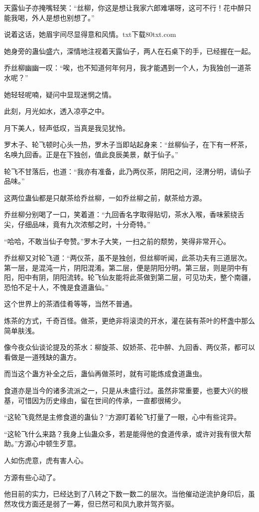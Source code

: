 \begin{this_body}
天露仙子亦掩嘴轻笑：“丝柳，你这是想让我家六郎难堪呀，这可不行！花中醉只能我喝，外人是想也别想了。”

说着这话，她眉宇间尽显得意和风情。txt下载80txt.com

她身旁的蛊仙盛六，深情地注视着天露仙子，两人在石桌下的手，已经握在一起。

乔丝柳幽幽一叹：“唉，也不知道何年何月，我才能遇到一个人，为我独创一道茶水呢？”

她轻轻呢喃，疑问中显现迷惘之情。

此刻，月光如水，透入凉亭之中。

月下美人，轻声低叹，当真是我见犹怜。

罗木子、轮飞顿时心头一热，罗木子当即站起身来：“丝柳仙子，在下有一杯茶，名唤九回香。正是在下独创，值此良辰美景，献于仙子。”

轮飞不甘落后，也道：“我亦有准备，此乃两仪茶，阴阳之间，泾渭分明，请仙子品味。”

这两位蛊仙都是只献茶给乔丝柳，一如乔丝柳之前，献茶给方源。

乔丝柳分别喝了一口，笑着道：“九回香名字取得贴切，茶水入喉，香味萦绕舌尖，仔细品味，竟有九次浓郁之时，十分奇特。”

“哈哈，不敢当仙子夸赞。”罗木子大笑，一扫之前的颓势，笑得非常开心。

乔丝柳又对轮飞道：“两仪茶，虽不是独创，但丝柳听闻，此茶功夫有三道层次。第一层，是混沌一片，阴阳混淆。第二层，便是阴阳分明。第三层，则是阴中有阳，阳中有阴，阴阳流转。轮飞仙友能将此茶做到第二层，可见功夫，整个南疆，恐怕不足十人，不愧是食道蛊仙。”

这个世界上的茶酒佳肴等等，当然不普通。

炼茶的方式，千奇百怪。做茶，更绝非将滚烫的开水，灌在装有茶叶的杯盏中那么简单肤浅。

像今夜众仙谈论提及的茶水：柳旋茶、奴娇茶、花中醉、九回香、两仪茶，都可以看做是一道残缺的蛊方。

而当这个蛊方补全之后，蛊仙再做茶时，就有可能炼成食道蛊虫。

食道亦是当今的诸多流派之一，只是从未盛行过。虽然非常重要，也要大兴的根基，可惜因为历史缘由，留在世间的传承，一直都很稀少。

“这轮飞竟然是主修食道的蛊仙？”方源盯着轮飞打量了一眼，心中有些诧异。

“这轮飞什么来路？我身上仙蛊众多，若是能得他的食道传承，或许对我有很大帮助。”方源心中顿生歹意。

人如伤虎意，虎有害人心。

方源有些心动了。

他目前的实力，已经达到了八转之下数一数二的层次。当他催动逆流护身印后，虽然攻伐方面还是弱了一筹，但已然可和凤九歌并驾齐驱。


\end{this_body}
